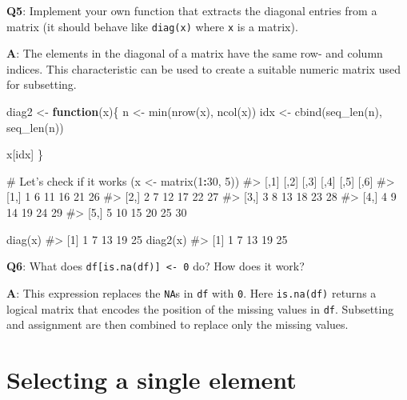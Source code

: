 \documentclass[
]{krantz}
\makeatletter
\newenvironment{Shaded}{\begin{snugshade}}{\end{snugshade}}
\newcommand{\CommentTok}[1]{\textcolor[rgb]{0.56,0.35,0.01}{\textit{#1}}}
\newcommand{\ControlFlowTok}[1]{\textcolor[rgb]{0.13,0.29,0.53}{\textbf{#1}}}
\newcommand{\DecValTok}[1]{\textcolor[rgb]{0.00,0.00,0.81}{#1}}
\newcommand{\KeywordTok}[1]{\textcolor[rgb]{0.13,0.29,0.53}{\textbf{#1}}}
\newcommand{\NormalTok}[1]{#1}
\newcommand{\OperatorTok}[1]{\textcolor[rgb]{0.81,0.36,0.00}{\textbf{#1}}}
\newcommand{\StringTok}[1]{\textcolor[rgb]{0.31,0.60,0.02}{#1}}
\newenvironment{kframe}{%
\medskip{}
\setlength{\fboxsep}{.8em}
 \def\at@end@of@kframe{}%
 \ifinner\ifhmode%
  \def\at@end@of@kframe{\end{minipage}}%
  \begin{minipage}{\columnwidth}%
 \fi\fi%
 \def\FrameCommand##1{\hskip\@totalleftmargin \hskip-\fboxsep
 \colorbox{shadecolor}{##1}\hskip-\fboxsep
     \hskip-\linewidth \hskip-\@totalleftmargin \hskip\columnwidth}%
 \MakeFramed {\advance\hsize-\width
   \@totalleftmargin\z@ \linewidth\hsize
   \@setminipage}}%
 {\par\unskip\endMakeFramed%
 \at@end@of@kframe}
\renewenvironment{Shaded}{\begin{kframe}}{\end{kframe}}
\renewcommand{\KeywordTok} [1]{\textcolor[rgb]{0.00,0.44,0.13}{{#1}}}
\renewcommand{\DecValTok}  [1]{\textcolor[rgb]{0.25,0.63,0.44}{{#1}}}
\renewcommand{\StringTok}  [1]{\textcolor[rgb]{0.25,0.44,0.63}{{#1}}}
\renewcommand{\CommentTok} [1]{\textcolor[rgb]{0.38,0.63,0.69}{{#1}}}
\renewcommand{\NormalTok}  [1]{{#1}}
\makeatother
\begin{document}
\textbf{{Q5}}: Implement your own function that extracts the diagonal entries from a matrix (it should behave like \texttt{diag(x)} where \texttt{x} is a matrix).

\textbf{{A}}: The elements in the diagonal of a matrix have the same row- and column indices. This characteristic can be used to create a suitable numeric matrix used for subsetting.

\begin{Shaded}
\begin{Highlighting}[]
\NormalTok{diag2 <-}\StringTok{ }\ControlFlowTok{function}\NormalTok{(x)\{}
\NormalTok{  n <-}\StringTok{ }\KeywordTok{min}\NormalTok{(}\KeywordTok{nrow}\NormalTok{(x), }\KeywordTok{ncol}\NormalTok{(x))}
\NormalTok{  idx <-}\StringTok{ }\KeywordTok{cbind}\NormalTok{(}\KeywordTok{seq_len}\NormalTok{(n), }\KeywordTok{seq_len}\NormalTok{(n))}
  
\NormalTok{  x[idx]}
\NormalTok{\}}

\CommentTok{# Let's check if it works}
\NormalTok{(x <-}\StringTok{ }\KeywordTok{matrix}\NormalTok{(}\DecValTok{1}\OperatorTok{:}\DecValTok{30}\NormalTok{, }\DecValTok{5}\NormalTok{))}
\CommentTok{#>      [,1] [,2] [,3] [,4] [,5] [,6]}
\CommentTok{#> [1,]    1    6   11   16   21   26}
\CommentTok{#> [2,]    2    7   12   17   22   27}
\CommentTok{#> [3,]    3    8   13   18   23   28}
\CommentTok{#> [4,]    4    9   14   19   24   29}
\CommentTok{#> [5,]    5   10   15   20   25   30}

\KeywordTok{diag}\NormalTok{(x)}
\CommentTok{#> [1]  1  7 13 19 25}
\KeywordTok{diag2}\NormalTok{(x)}
\CommentTok{#> [1]  1  7 13 19 25}
\end{Highlighting}
\end{Shaded}

\textbf{{Q6}}: What does \texttt{df{[}is.na(df){]}\ \textless{}-\ 0} do? How does it work?

\textbf{{A}}: This expression replaces the \texttt{NA}s in \texttt{df} with \texttt{0}. Here \texttt{is.na(df)} returns a logical matrix that encodes the position of the missing values in \texttt{df}. Subsetting and assignment are then combined to replace only the missing values.

\hypertarget{selecting-a-single-element}{%
\section{Selecting a single element}\label{selecting-a-single-element}}
\end{document}
